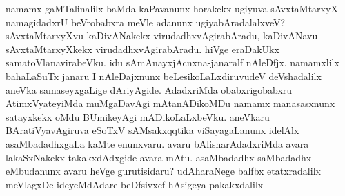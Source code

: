 \hbox{namamx} gaMTalinalilx baMda kaPavanunx horakekx ugiyuva sAvxtaMtarxyX namagidadxrU beVrobabxra meVle adanunx ugiyabAradalalxveV? sAvxtaMtarxyXvu kaDivANakekx virudadhxvAgirabAradu, kaDivANavu sAvxtaMtarxyXkekx virudadhxvAgirabAradu. hiVge eraDakUkx samatoVlanavirabeVku. idu sAmAnayxjAcnxna-janaralf nAleDfjx. namamxlilx bahaLaSuTx janaru I nAleDajxnunx beLesikoLaLxdiruvudeV deVshadalilx aneVka samaseyxgaLige dAriyAgide. AdadxriMda obabxrigobabxru AtimxVyateyiMda muMgaDavAgi mAtanADikoMDu namamx manasasxnunx satayxkekx oMdu BUmikeyAgi mADikoLaLxbeVku. aneVkaru BAratiVyavAgiruva eSoTxV sAMsakxqqtika viSayagaLanunx idelAlx asaMbadadhxgaLa kaMte enunxvaru. avaru bAlisharAdadxriMda avara lakaSxNakekx takakxdAdxgide avara mAtu. asaMbadadhx-saMbadadhx eMbudanunx avaru heVge gurutisidaru? udAharaNege balfbx etatxradalilx meVlagxDe ideyeMdAdare beDfsivxcf hAsigeya pakakxdalilx 
